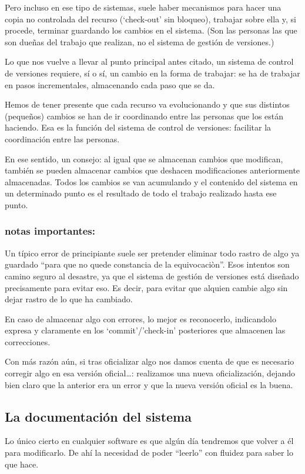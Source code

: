 \documentclass[spanish,12pt,a4paper,final,oneside]{book}
\begin{document}
Pero incluso en ese tipo de sistemas, suele haber mecanismos para hacer una copia no controlada del recurso (‘check-out’ sin bloqueo), trabajar sobre ella y, si procede, terminar guardando los cambios en el sistema. (Son las personas las que son dueñas del trabajo que realizan, no el sistema de gestión de versiones.)

Lo que nos vuelve a llevar al punto principal antes citado, un sistema de control de versiones requiere, sí o sí, un cambio en la forma de trabajar: se ha de trabajar en pasos incrementales, almacenando cada paso que se da. 

Hemos de tener presente que cada recurso va evolucionando y que sus distintos (pequeños) cambios se han de ir coordinando entre las personas que los están haciendo. Esa es la función del sistema de control de versiones: facilitar la coordinación entre las personas.

En ese sentido, un consejo: al igual que se almacenan cambios que modifican, también se pueden almacenar cambios que deshacen modificaciones anteriormente almacenadas. Todos los cambios se van acumulando y el contenido del sistema en un determinado punto es el resultado de todo el trabajo realizado hasta ese punto.
 

\subsubsection*{notas importantes:} 
Un  típico error de principiante suele ser pretender eliminar todo rastro de algo ya guardado ``para que no quede constancia de la equivocaciòn''. Esos intentos son camino seguro al desastre, ya que el sistema de gestión de versiones está diseñado precisamente para evitar eso. Es decir, para evitar que alquien cambie algo sin dejar rastro de lo que ha cambiado. 

En caso de almacenar algo con errores, lo mejor es reconocerlo, indicandolo expresa y claramente en los ‘commit’/’check-in’ posteriores que almacenen las correcciones.

Con más razón aún, si tras oficializar algo nos damos cuenta de que es necesario corregir algo en esa versión oficial…: realizamos una nueva oficialización, dejando bien claro que la anterior era un error y que la nueva versión oficial es la buena. 

\subsection{La documentación del sistema}
Lo único cierto en cualquier software es que algún día tendremos que volver a él para modificarlo. De ahí la necesidad de poder ``leerlo'' con fluidez para saber lo que hace.
\end{document}
